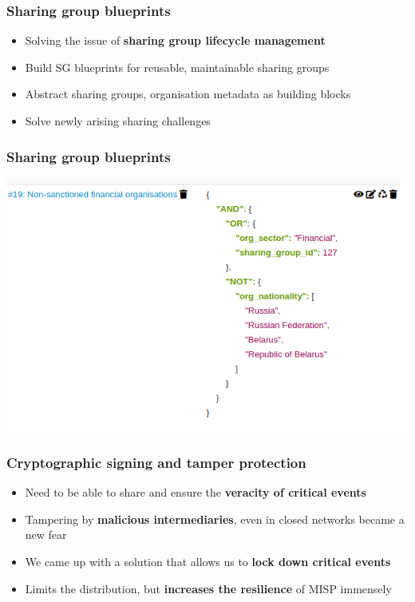 \begin{frame}
  \frametitle{Sharing group blueprints}
  \begin{itemize}
     \item Solving the issue of {\bf sharing group lifecycle management}
     \item Build SG blueprints for reusable, maintainable sharing groups
     \item Abstract sharing groups, organisation metadata as building blocks
     \item Solve newly arising sharing challenges
  \end{itemize}
\end{frame}

\begin{frame}
\frametitle{Sharing group blueprints}
\includegraphics[scale=0.6]{images/blueprints2.png}
\end{frame}

\begin{frame}
  \frametitle{Cryptographic signing and tamper protection}
  \begin{itemize}
     \item Need to be able to share and ensure the {\bf veracity of critical events}
     \item Tampering by {\bf malicious intermediaries}, even in closed networks became a new fear
     \item We came up with a solution that allows us to {\bf lock down critical events}
     \item Limits the distribution, but {\bf increases the resilience} of MISP immensely
  \end{itemize}
\end{frame}

